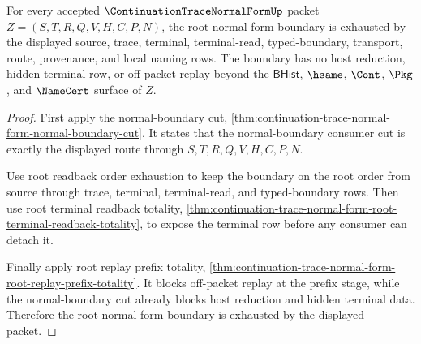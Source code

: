 \begin{theorem}
\label{thm:continuation-trace-normal-form-root-normal-boundary-exhaustion}
For every accepted $\ContinuationTraceNormalFormUp$ packet
$Z=(S,T,R,Q,V,H,C,P,N)$, the root normal-form boundary is exhausted by the
displayed source, trace, terminal, terminal-read, typed-boundary, transport,
route, provenance, and local naming rows. The boundary has no host reduction,
hidden terminal row, or off-packet replay beyond the $\mathsf{BHist}$,
$\hsame$, $\Cont$, $\Pkg$, and $\NameCert$ surface of $Z$.
\end{theorem}
\begin{proof}
First apply the normal-boundary cut,
\autoref{thm:continuation-trace-normal-form-normal-boundary-cut}. It states
that the normal-boundary consumer cut is exactly the displayed route through
$S,T,R,Q,V,H,C,P,N$.

Use root readback order exhaustion to keep the boundary on the root order
from source through trace, terminal, terminal-read, and typed-boundary rows.
Then use root terminal readback totality,
\autoref{thm:continuation-trace-normal-form-root-terminal-readback-totality},
to expose the terminal row before any consumer can detach it.

Finally apply root replay prefix totality,
\autoref{thm:continuation-trace-normal-form-root-replay-prefix-totality}. It
blocks off-packet replay at the prefix stage, while the normal-boundary cut
already blocks host reduction and hidden terminal data. Therefore the root
normal-form boundary is exhausted by the displayed packet.
\end{proof}


